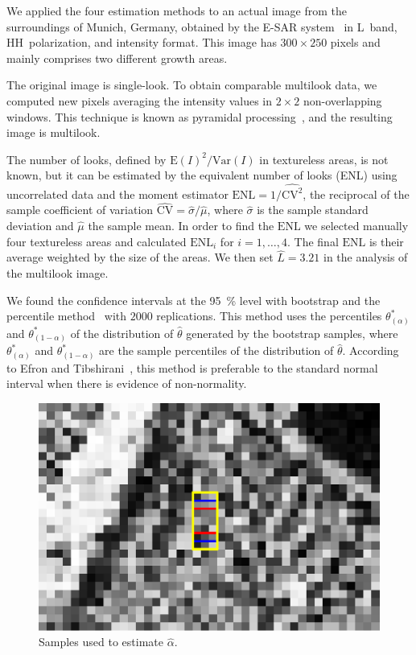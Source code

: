 \documentclass[twocolumn]{svjour3}
\begin{document}
We applied the four estimation methods to an actual image from the surroundings of Munich, Germany, obtained by the E-SAR system~\cite{Horn1996} in L~band, HH~polarization, and intensity format. 
This image has $300\times250$ pixels and mainly comprises two different growth areas.

The original image is single-look.
To obtain comparable multilook data, we computed new pixels averaging the intensity values in $2\times2$ non-overlapping windows. This technique is known as pyramidal processing~\cite{Adelson1984}, and the resulting image is multilook.

The number of looks, defined by ${\text{E}(I)^2}/{\text{Var}(I)}$ in textureless areas, is not known, but it can be estimated by the equivalent number of looks (ENL) using uncorrelated data and the moment estimator
$\text{ENL}={1}/{\widehat{\text{CV}^2}}$, the reciprocal of the sample coefficient of variation $\widehat{\text{CV}}={\widehat{\sigma}}/{\widehat\mu}$, where $\widehat{\sigma}$ is the sample standard deviation and $\widehat\mu$ the sample mean.
In order to find the $\text{ENL}$ we selected manually four textureless areas and calculated $\text{ENL}_i$ for $i=1, \ldots, 4$. 
The final $\text{ENL}$ is their average weighted by the size of the areas. 
We then set $\widehat L=3.21$ in the analysis of the multilook image.

We found the confidence intervals at the \SI{95}{\percent} level with bootstrap and the percentile method~\cite{Davison1997} with $2000$ replications.     
This method uses the percentiles $\theta^*_{(\alpha)}$ and $\theta^*_{(1-\alpha)}$ of the distribution of $\widehat{\theta} $ generated by the bootstrap samples, where $\theta^*_{(\alpha)}$ and $\theta^*_{(1-\alpha)}$ are the sample percentiles of the distribution of $\widehat{\theta} $. 
According to Efron and Tibshirani~\cite{Efron93}, this method is preferable to the standard normal interval when there is evidence of non-normality.

\begin{figure}[hbt]
	\centering
	\includegraphics[width=0.8\linewidth]{../../../Figures/PaperTesis/TresMuestrasAgrandada.eps}
	\caption{Samples used to estimate $\widehat{\alpha}$.}\label{TresMuestras} 
\end{figure}
\end{document}
